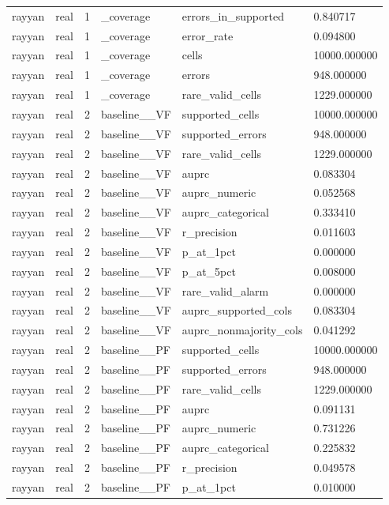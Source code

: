 \begin{tabular}{llllll}
rayyan & real & 1 & \_coverage & errors\_in\_supported & 0.840717 \\
rayyan & real & 1 & \_coverage & error\_rate & 0.094800 \\
rayyan & real & 1 & \_coverage & cells & 10000.000000 \\
rayyan & real & 1 & \_coverage & errors & 948.000000 \\
rayyan & real & 1 & \_coverage & rare\_valid\_cells & 1229.000000 \\
rayyan & real & 2 & baseline\_\_VF & supported\_cells & 10000.000000 \\
rayyan & real & 2 & baseline\_\_VF & supported\_errors & 948.000000 \\
rayyan & real & 2 & baseline\_\_VF & rare\_valid\_cells & 1229.000000 \\
rayyan & real & 2 & baseline\_\_VF & auprc & 0.083304 \\
rayyan & real & 2 & baseline\_\_VF & auprc\_numeric & 0.052568 \\
rayyan & real & 2 & baseline\_\_VF & auprc\_categorical & 0.333410 \\
rayyan & real & 2 & baseline\_\_VF & r\_precision & 0.011603 \\
rayyan & real & 2 & baseline\_\_VF & p\_at\_1pct & 0.000000 \\
rayyan & real & 2 & baseline\_\_VF & p\_at\_5pct & 0.008000 \\
rayyan & real & 2 & baseline\_\_VF & rare\_valid\_alarm & 0.000000 \\
rayyan & real & 2 & baseline\_\_VF & auprc\_supported\_cols & 0.083304 \\
rayyan & real & 2 & baseline\_\_VF & auprc\_nonmajority\_cols & 0.041292 \\
rayyan & real & 2 & baseline\_\_PF & supported\_cells & 10000.000000 \\
rayyan & real & 2 & baseline\_\_PF & supported\_errors & 948.000000 \\
rayyan & real & 2 & baseline\_\_PF & rare\_valid\_cells & 1229.000000 \\
rayyan & real & 2 & baseline\_\_PF & auprc & 0.091131 \\
rayyan & real & 2 & baseline\_\_PF & auprc\_numeric & 0.731226 \\
rayyan & real & 2 & baseline\_\_PF & auprc\_categorical & 0.225832 \\
rayyan & real & 2 & baseline\_\_PF & r\_precision & 0.049578 \\
rayyan & real & 2 & baseline\_\_PF & p\_at\_1pct & 0.010000 \\

\end{tabular}
